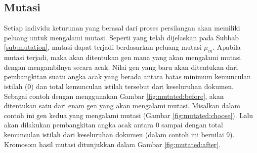 \subsection{Mutasi}
Setiap individu keturunan yang berasal dari proses persilangan akan memiliki peluang untuk mengalami mutasi. Seperti yang telah dijelaskan pada Subbab \ref{sub:mutation}, mutasi dapat terjadi berdasarkan peluang mutasi $\mu_m$. Apabila mutasi terjadi, maka akan ditentukan gen mana yang akan mengalami mutasi dengan mengambilnya secara acak. Nilai gen yang baru akan ditentukan dari pembangkitan suatu angka acak yang berada antara batas minimum kemunculan istilah (0) dan total kemunculan istilah tersebut dari keseluruhan dokumen. Sebagai contoh dengan menggunakan Gambar \ref{fig:mutated:before}, akan ditentukan satu dari enam gen yang akan mengalami mutasi. Misalkan dalam contoh ini gen kedua yang mengalami mutasi (Gambar \ref{fig:mutated:choose}). Lalu akan dilakukan pembangkitan angka acak antara 0 sampai dengan total kemunculan istilah dari keseluruhan dokumen (dalam contoh ini bernilai 9). Kromosom hasil mutasi ditunjukkan dalam Gambar \ref{fig:mutated:after}.

